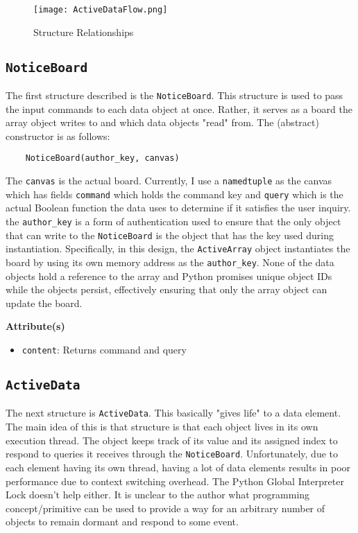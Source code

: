 \documentclass[10pt]{article}
\begin{document}
	\begin{figure}[htbp]
		\centering
		\texttt{[image: ActiveDataFlow.png]}
		\caption{Structure Relationships}
		\label{fig:relationships}
	\end{figure}

\subsection{\lstinline|NoticeBoard|}
	The first structure described is the \lstinline|NoticeBoard|. This structure is used to pass the input commands to each data object at once. Rather, it serves as a board the array object writes to and which data objects "read" from. 
	The (abstract) constructor is as follows:
	
	\begin{lstlisting}
	NoticeBoard(author_key, canvas)
	\end{lstlisting}
	
	The \lstinline|canvas| is the actual board. Currently, I use a \lstinline|namedtuple| as the canvas which has fields \lstinline|command| which holds the command key and \lstinline|query| which is the actual Boolean function the data uses to determine if it satisfies the user inquiry. the \lstinline|author_key| is a form of authentication used to ensure that the only object that can write to the \lstinline|NoticeBoard| is the object that has the key used during instantiation. Specifically, in this design, the \lstinline|ActiveArray| object instantiates the board by using its own memory address as the \lstinline|author_key|. None of the data objects hold a reference to the array and Python promises unique object IDs while the objects persist, effectively ensuring that only the array object can update the board.
	
	\noindent\textbf{Attribute(s)}
	
	\begin{itemize}
		\item \lstinline|content|: Returns command and query
	\end{itemize}
	
\subsection{\lstinline|ActiveData|}
	The next structure is \lstinline|ActiveData|. This basically "gives life" to a data element. The main idea of this is that structure is that each object lives in its own execution thread. The object keeps track of its value and its assigned index to respond to queries it receives through the \lstinline|NoticeBoard|. Unfortunately, due to each element having its own thread, having a lot of data elements results in poor performance due to context switching overhead. The Python Global Interpreter Lock doesn't help either. It is unclear to the author what programming concept/primitive can be used to provide a way for an arbitrary number of objects to remain dormant and respond to some event. 
\end{document}
